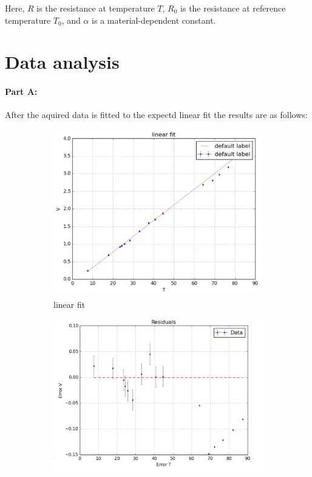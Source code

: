 \documentclass[12pt,a4paper]{article}
\begin{document}
Here, $R$ is the resistance at temperature $T$, $R_0$ is the resistance at reference temperature $T_0$, and $\alpha$ is a material-dependent constant.

\pagebreak
\section{Data analysis}
\paragraph{Part A:}
After the aquired data is fitted to the expectd linear fit the results are as follows:
\begin{figure}[htbp]
    \centering
    \begin{subfigure}[b]{0.48\textwidth}
      \includegraphics[width=\textwidth]{Part A results/linear fit.png}
      \caption{linear fit}
      \label{fig:partA1}
    \end{subfigure}
    \hfill
    \begin{subfigure}[b]{0.48\textwidth}
      \includegraphics[width=\textwidth]{Part A results/res.png}

\end{subfigure}
\end{figure}
\end{document}
